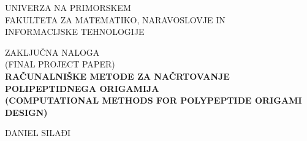 \documentclass[12pt,a4paper,titlepage,openany]{report}
\begin{document}
\pagestyle{empty}
\reversemarginpar
{}

\begin{center}
\vspace{-1cm}
\noindent \large UNIVERZA NA PRIMORSKEM\\
\large FAKULTETA ZA MATEMATIKO, NARAVOSLOVJE IN\\
INFORMACIJSKE TEHNOLOGIJE


\vspace*{\fill}
\large ZAKLJU\v CNA NALOGA\\
\large (FINAL PROJECT PAPER)\\
\vspace{0.3cm}
\textbf{\Large RAČUNALNIŠKE METODE ZA NAČRTOVANJE
	POLIPEPTIDNEGA ORIGAMIJA}\\
\textbf{\Large (COMPUTATIONAL METHODS FOR POLYPEPTIDE ORIGAMI DESIGN)}\\
\vspace*{\fill}
\vspace{1.8cm}
\end{center}


\begin{flushright}
\noindent \large DANIEL SILAĐI\\
\vspace{2cm}
\end{flushright}
\end{document}
